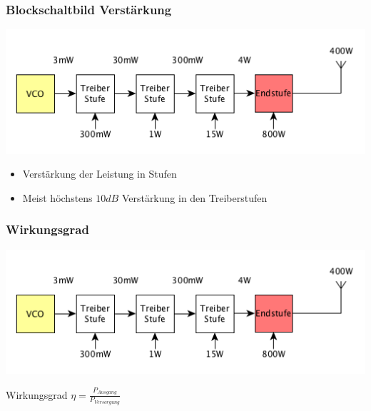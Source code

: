 \begin{frame}
  \frametitle{Blockschaltbild Verstärkung}
  \begin{center}
    \includegraphics[width=1\textwidth,height=.6\textheight,keepaspectratio]{a07/paBsb.png}
    \begin{itemize}
      \item Verstärkung der Leistung in Stufen
      \item Meist höchstens $10dB$ Verstärkung in den Treiberstufen
    \end{itemize}
  \end{center}
\end{frame}

\begin{frame}
  \frametitle{Wirkungsgrad}
  \begin{center}
    \includegraphics[width=1\textwidth,height=.5\textheight,keepaspectratio]{a07/paBsb.png} \huge
    \begin{block}{Wirkungsgrad}
      $\eta = \frac{P_{Ausgang}}{P_{Versorgung}}$
    \end{block}
  \end{center}
\end{frame}

